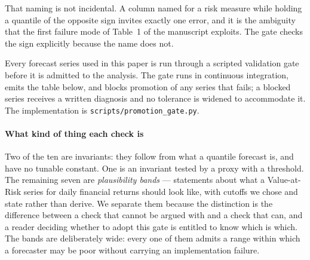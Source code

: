 \documentclass[preprint,11pt,authoryear]{elsarticle}
\newcommand{\1}{\boldsymbol{1}}
\begin{document}
That naming is not incidental. A column named for a risk measure while holding a
quantile of the opposite sign invites exactly one error, and it is the ambiguity
that the first failure mode of Table~1 of the manuscript exploits. The gate
checks the sign explicitly because the name does not.

\bigskip

Every forecast series used in this paper is run through a scripted validation
gate before it is admitted to the analysis. The gate runs in continuous
integration, emits the table below, and blocks promotion of any series that
fails; a blocked series receives a written diagnosis and no tolerance is widened
to accommodate it. The implementation is \texttt{scripts/promotion\_gate.py}.

\paragraph{What kind of thing each check is} Two of the ten are invariants: they
follow from what a quantile forecast is, and have no tunable constant. One is an
invariant tested by a proxy with a threshold. The remaining seven are
\emph{plausibility bands} --- statements about what a Value-at-Risk series for
daily financial returns should look like, with cutoffs we chose and state rather
than derive. We separate them because the distinction is the difference between
a check that cannot be argued with and a check that can, and a reader deciding
whether to adopt this gate is entitled to know which is which. The bands are
deliberately wide: every one of them admits a range within which a forecaster may
be poor without carrying an implementation failure.
\end{document}
